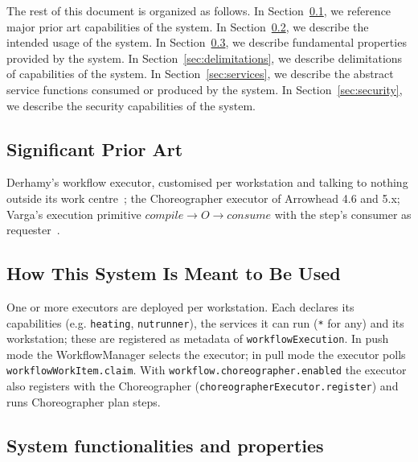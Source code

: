 \documentclass[a4paper]{arrowhead}
\begin{document}
The rest of this document is organized as follows.
In Section~\ref{sec:prior_art}, we reference major prior art capabilities of the system.
In Section~\ref{sec:use}, we describe the intended usage of the system.
In Section~\ref{sec:properties}, we describe fundamental properties provided by the system.
In Section~\ref{sec:delimitations}, we describe delimitations of capabilities of the system.
In Section~\ref{sec:services}, we describe the abstract service functions consumed or produced by the system.
In Section~\ref{sec:security}, we describe the security capabilities of the system.

\newpage
\subsection{Significant Prior Art}
\label{sec:prior_art}
Derhamy's workflow executor, customised per workstation and talking to nothing outside its work
centre~\cite{derhamy2018workflow}; the Choreographer executor of Arrowhead 4.6 and 5.x; Varga's execution primitive
$compile \rightarrow O \rightarrow consume$ with the step's consumer as requester~\cite{varga2026}.

\subsection{How This System Is Meant to Be Used}
\label{sec:use}
One or more executors are deployed per workstation. Each declares its capabilities (e.g. \texttt{heating},
\texttt{nutrunner}), the services it can run (\texttt{*} for any) and its workstation; these are registered as
metadata of \texttt{workflowExecution}. In push mode the WorkflowManager selects the executor; in pull mode the
executor polls \texttt{workflowWorkItem.claim}. With \texttt{workflow.choreographer.enabled} the executor also
registers with the Choreographer (\texttt{choreographerExecutor.register}) and runs Choreographer plan steps.

\subsection{System functionalities and properties}
\label{sec:properties}
\end{document}
